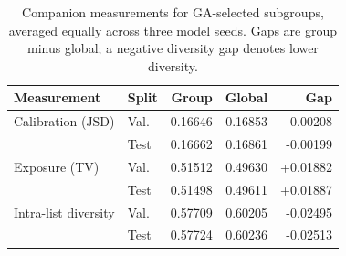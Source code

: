 \begin{table}[t]
\centering
\caption{Companion measurements for GA-selected subgroups, averaged equally across three model seeds. Gaps are group minus global; a negative diversity gap denotes lower diversity.}
\label{tab:audit}
\small
\begin{tabular}{llrrr}
\toprule
Measurement & Split & Group & Global & Gap \\
\midrule
Calibration (JSD) & Val. & 0.16646 & 0.16853 & -0.00208 \\
 & Test & 0.16662 & 0.16861 & -0.00199 \\
Exposure (TV) & Val. & 0.51512 & 0.49630 & +0.01882 \\
 & Test & 0.51498 & 0.49611 & +0.01887 \\
Intra-list diversity & Val. & 0.57709 & 0.60205 & -0.02495 \\
 & Test & 0.57724 & 0.60236 & -0.02513 \\
\bottomrule
\end{tabular}
\end{table}
